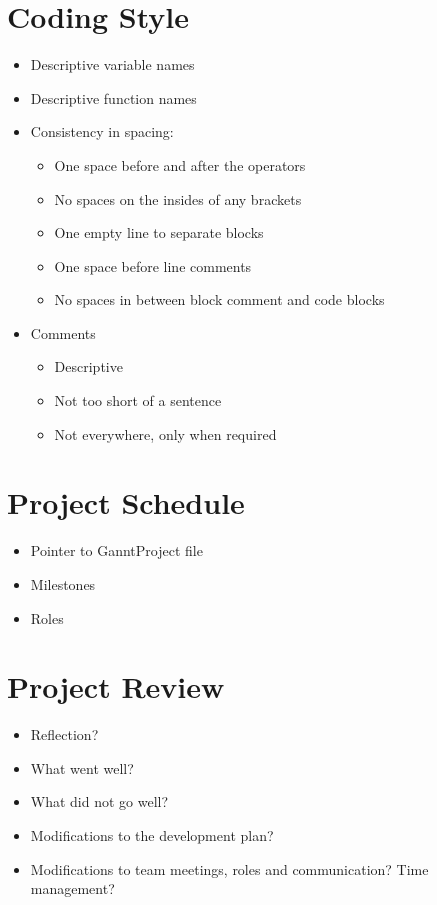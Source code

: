 \documentclass{article}
\begin{document}
\section{Coding Style}
\begin{itemize}
\item Descriptive variable names
\item Descriptive function names
\item Consistency in spacing:
\begin{itemize}
\item One space before and after the operators
\item No spaces on the insides of any brackets
\item One empty line to separate blocks
\item One space before line comments
\item No spaces in between block comment and code blocks
\end{itemize}
\item Comments
\begin{itemize}
\item Descriptive
\item Not too short of a sentence
\item Not everywhere, only when required
\end{itemize}
\end{itemize}
\section{Project Schedule}
\begin{itemize}
\item Pointer to GanntProject file
\item Milestones
\item Roles
\end{itemize}
\section{Project Review}
\begin{itemize}
\item Reflection?
\item What went well?
\item  What did not go well?
\item Modifications to the development plan?
\item Modifications to team meetings, roles and communication? Time management?
\end{itemize}
\end{document}
